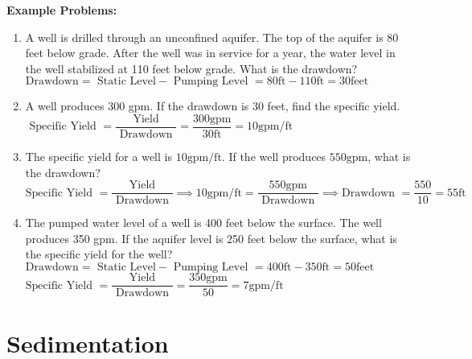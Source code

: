 \vspace{0.2cm}
\textbf{Example Problems:}\\
\vspace{0.2cm}
\begin{enumerate}[1.]
\item A well is drilled through an unconfined aquifer. The top of the aquifer is 80 feet below grade. After the well was in service for a year, the water level in the well stabilized at 110 feet below grade. What is the drawdown?\\
$\text {Drawdown} =\text { Static Level}-\text { Pumping Level } =80 \mathrm{ft}-110 \mathrm{ft}=30 \mathrm{feet}$

\item A well produces 300 gpm. If the drawdown is 30 feet, find the specific yield.\\
$\text { Specific Yield } =\dfrac{\text { Yield }}{\text { Drawdown }} =\dfrac{300 \mathrm{gpm}}{30 \mathrm{ft}} =10 \mathrm{gpm} / \mathrm{ft}$\\
  \vspace{0.3cm}
\item The specific yield for a well is $10 \mathrm{gpm} / \mathrm{ft}$. If the well produces $550 \mathrm{gpm}$, what is the drawdown?\\
  \vspace{0.3cm}
$\text {Specific Yield }=\dfrac{\text { Yield }}{\text { Drawdown }}\implies 10 \mathrm{gpm} / \mathrm{ft}=\dfrac{550 \mathrm{gpm}}{\text { Drawdown }} \implies \text {Drawdown }= \dfrac{550}{10}=\boxed{55 \mathrm{ft}}$ \\
\item The pumped water level of a well is 400 feet below the surface. The well produces 350 gpm. If the aquifer level is 250 feet below the surface, what is the specific yield for the well?\\
  $\text {Drawdown} =\text { Static Level}-\text { Pumping Level } =400 \mathrm{ft}-350 \mathrm{ft}=50 \mathrm{feet}$\\
  $\text {Specific Yield }=\dfrac{\text { Yield }}{\text { Drawdown }}=\dfrac{350 \mathrm{gpm}}{\text { 50 }}=7 \mathrm{gpm} / \mathrm{ft}$ \\
\end{enumerate}


\section{Sedimentation}

